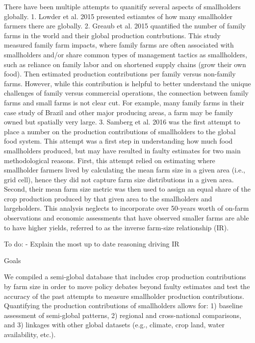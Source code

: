 \documentclass[11pt]{article}
\begin{document}
There have been multiple attempts to quanitify several aspects of
smallholders globally. 1. Lowder et al. 2015 presented estiamtes of how
many smallholder farmers there are globally. 2. Greaub et al. 2015
quantified the number of family farms in the world and their global
production contrbutions. This study measured family farm impacts, where
family farms are often associated with smallholders and/or share common
types of management tactics as smallholders, such as reliance on family
labor and on shortened supply chains (grow their own food). Then
estimated production contributions per family versus non-family farms.
However, while this contribution is helpful to better understand the
unique challenges of family versus commercial operations, the connection
between family farms and small farms is not clear cut. For example, many
family farms in their case study of Brazil and other major producing
areas, a farm may be family owned but spatially very large. 3. Samberg
et al. 2016 was the first attempt to place a number on the production
contributions of smallholders to the global food system. This attempt
was a first step in understanding how much food smallholders produced,
but may have resulted in faulty estimates for two main methodological
reasons. First, this attempt relied on estimating where smallholder
farmers lived by calculating the mean farm size in a given area (i.e.,
grid cell), hence they did not capture farm size distributions in a
given area. Second, their mean farm size metric was then used to assign
an equal share of the crop production produced by that given area to the
smallholders and largeholders. This analysis neglects to incorporate
over 50-years worth of on-farm observations and economic assessments
that have observed smaller farms are able to have higher yields,
referred to as the inverse farm-size relationship (IR).

To do: - Explain the most up to date reasoning driving IR

    Goals

We compiled a semi-global database that includes crop production
contributions by farm size in order to move policy debates beyond faulty
estimates and test the accuracy of the past attempts to measure
smallholder production contributions. Quantifying the production
contributions of smallholders allows for: 1) baseline assessment of
semi-global patterns, 2) regional and cross-national comparisons, and 3)
linkages with other global datasets (e.g., climate, crop land, water
availability, etc.).
\end{document}
